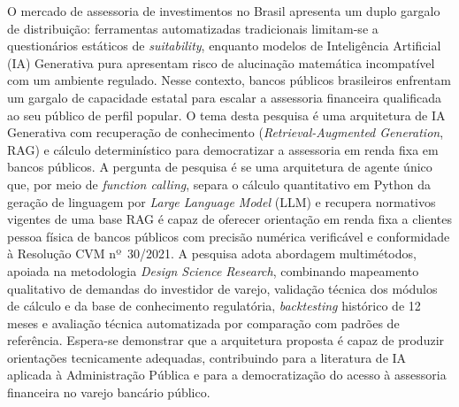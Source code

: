 
\begin{resumo}
O mercado de assessoria de investimentos no Brasil apresenta um duplo gargalo
de distribuição: ferramentas automatizadas tradicionais limitam-se a
questionários estáticos de \textit{suitability}, enquanto modelos de
Inteligência Artificial (IA) Generativa pura apresentam risco de alucinação
matemática incompatível com um ambiente regulado. Nesse contexto, bancos
públicos brasileiros enfrentam um gargalo de capacidade estatal para escalar a
assessoria financeira qualificada ao seu público de perfil popular. O tema
desta pesquisa é uma arquitetura de IA Generativa com recuperação de
conhecimento (\textit{Retrieval-Augmented Generation}, RAG) e cálculo
determinístico para democratizar a assessoria em renda fixa em bancos
públicos. A pergunta de pesquisa é se uma arquitetura de agente único que, por
meio de \textit{function calling}, separa o cálculo quantitativo em Python da
geração de linguagem por \textit{Large Language Model} (LLM) e recupera
normativos vigentes de uma base RAG é capaz de oferecer orientação em renda
fixa a clientes pessoa física de bancos públicos com precisão numérica
verificável e conformidade à Resolução CVM nº~30/2021. A pesquisa adota
abordagem multimétodos, apoiada na metodologia \textit{Design Science
Research}, combinando mapeamento qualitativo de demandas do investidor de
varejo, validação técnica dos módulos de cálculo e da base de conhecimento
regulatória, \textit{backtesting} histórico de 12 meses e avaliação técnica
automatizada por comparação com padrões de referência. Espera-se demonstrar que
a arquitetura proposta é capaz de produzir orientações tecnicamente adequadas,
contribuindo para a literatura de IA aplicada à Administração Pública e para a
democratização do acesso à assessoria financeira no varejo bancário público.
\end{resumo}
